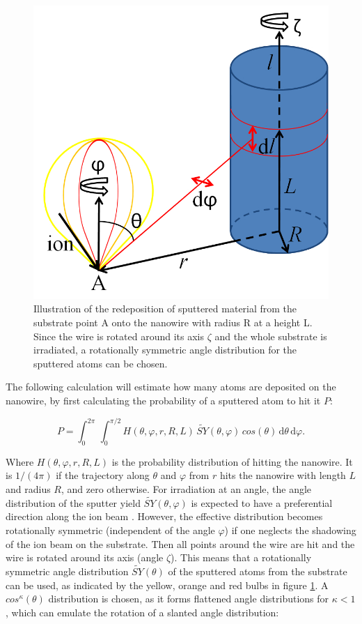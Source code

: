\begin{figure}
	\centering
		\includegraphics[width=.4\textwidth]{images/redeposit.jpg}
	\caption{Illustration of the redeposition of sputtered material from the substrate point A onto the nanowire with radius R at a height L. Since the wire is rotated around its axis $\zeta$ and the whole substrate is irradiated, a rotationally symmetric angle distribution for the sputtered atoms can be chosen.} 
	\label{redeposit}
\end{figure}

The following calculation will estimate how many atoms are deposited on the nanowire, by first calculating the probability of a sputtered atom to hit it $P$:

\begin{equation}
\label{prob1}
P = \int_0^{2\pi} \! \,\int_0^{\pi/2} \!\! H(\theta,\varphi,r,R,L) \, \tilde{SY}(\theta,\varphi) \,cos(\theta)\,\mathrm{d}\theta \, \mathrm{d}\varphi.
\end{equation}

Where $H(\theta,\varphi,r,R,L)$ is the probability distribution of hitting the nanowire. It is $1/(4\pi)$ if the trajectory along $\theta$ and $\varphi$ from $r$ hits the nanowire with length $L$ and radius $R$, and zero otherwise. For irradiation at an angle, the angle distribution of the sputter yield $\tilde{SY}(\theta,\varphi)$ is expected to have a preferential direction along the ion beam \cite{verdeil_angular_2008}. However, the effective distribution becomes rotationally symmetric (independent of the angle $\varphi$) if one neglects the shadowing of the ion beam on the substrate. Then all points around the wire are hit and the wire is rotated around its axis (angle $\zeta$). This means that a rotationally symmetric angle distribution $\tilde{SY}(\theta)$ of the sputtered atoms from the substrate can be used, as indicated by the yellow, orange and red bulbs in figure \ref{redeposit}. A $cos^\kappa(\theta)$ distribution is chosen, as it forms flattened angle distributions for $\kappa < 1$, which can emulate the rotation of a slanted angle distribution: 


